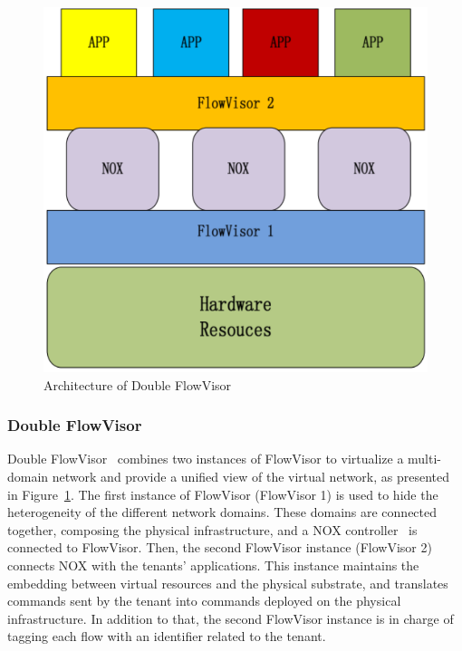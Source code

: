 \begin{figure}[ht]
    \centering
    \includegraphics[scale=0.6]{figures/double_fv.pdf}
    \caption{Architecture of Double FlowVisor~\cite{DoubleFV-Yin2013}}
    \label{fig:double-fv}
\end{figure}

\subsubsection{Double FlowVisor}
Double FlowVisor~\cite{DoubleFV-Yin2013} combines two instances of FlowVisor to virtualize a multi-domain network and provide a unified view of the virtual network, as presented in Figure~\ref{fig:double-fv}. The first instance of FlowVisor (FlowVisor 1) is used to hide the heterogeneity of the different network domains. These domains are connected together, composing the physical infrastructure, and a NOX controller~\cite{nox-gude2008} is connected to FlowVisor.
Then, the second FlowVisor instance (FlowVisor 2) connects NOX with the tenants' applications. This instance maintains the embedding between virtual resources and the physical substrate, and translates commands sent by the tenant into commands deployed on the physical infrastructure. In addition to that, the second FlowVisor instance is in charge of tagging each flow with an identifier related to the tenant.

